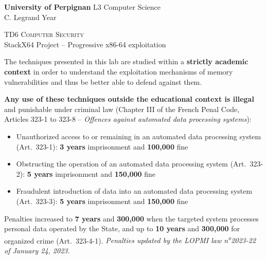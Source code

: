 \documentclass[a4paper,11pt]{article}
\theoremstyle{plain}
\theoremstyle{definition}
\begin{document}
\hbox{}
\noindent \textbf{University of Perpignan} \hfill  L3 Computer Science \\
 \hfill C. Legrand \hfill  Year \the\year  \\
\smallskip
\begin{center}
{
 {\scshape \large TD6 Computer Security}  \\
 StackX64 Project -- Progressive x86-64 exploitation
}
\end{center}
\hbox{}

\bigskip

\begin{ethique}
The techniques presented in this lab are studied within a \textbf{strictly academic context} in order to understand the exploitation mechanisms of memory vulnerabilities and thus be better able to defend against them.

\textbf{Any use of these techniques outside the educational context is illegal} and punishable under criminal law (Chapter III of the French Penal Code, Articles 323-1 to 323-8 -- \textit{Offences against automated data processing systems}):
\begin{itemize}
    \item Unauthorized access to or remaining in an automated data processing system (Art.~323-1): \textbf{3 years} imprisonment and \textbf{\texteuro{}100,000} fine
    \item Obstructing the operation of an automated data processing system (Art.~323-2): \textbf{5 years} imprisonment and \textbf{\texteuro{}150,000} fine
    \item Fraudulent introduction of data into an automated data processing system (Art.~323-3): \textbf{5 years} imprisonment and \textbf{\texteuro{}150,000} fine
\end{itemize}
Penalties increased to \textbf{7 years} and \textbf{\texteuro{}300,000} when the targeted system processes personal data operated by the State, and up to \textbf{10 years} and \textbf{\texteuro{}300,000} for organized crime (Art.~323-4-1). \textit{Penalties updated by the LOPMI law n\textsuperscript{o}2023-22 of January 24, 2023.}
\end{ethique}

\bigskip

\end{document}
